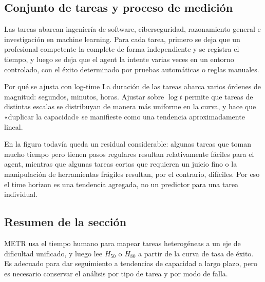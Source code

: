 \subsection{Conjunto de tareas y proceso de medición}



Las tareas abarcan ingeniería de software, ciberseguridad, razonamiento general e investigación en machine learning. Para cada tarea, primero se deja que un profesional competente la complete de forma independiente y se registra el tiempo, y luego se deja que el agent la intente varias veces en un entorno controlado, con el éxito determinado por pruebas automáticas o reglas manuales.

\begin{knowledgebox}{Por qué se ajusta con log-time}
La duración de las tareas abarca varios órdenes de magnitud: segundos, minutos, horas. Ajustar sobre $\log t$ permite que tareas de distintas escalas se distribuyan de manera más uniforme en la curva, y hace que «duplicar la capacidad» se manifieste como una tendencia aproximadamente lineal.
\end{knowledgebox}


En la figura todavía queda un residual considerable: algunas tareas que toman mucho tiempo pero tienen pasos regulares resultan relativamente fáciles para el agent, mientras que algunas tareas cortas que requieren un juicio fino o la manipulación de herramientas frágiles resultan, por el contrario, difíciles. Por eso el time horizon es una tendencia agregada, no un predictor para una tarea individual.

\subsection{Resumen de la sección}

METR usa el tiempo humano para mapear tareas heterogéneas a un eje de dificultad unificado, y luego lee $H_{50}$ o $H_{80}$ a partir de la curva de tasa de éxito. Es adecuado para dar seguimiento a tendencias de capacidad a largo plazo, pero es necesario conservar el análisis por tipo de tarea y por modo de falla.
